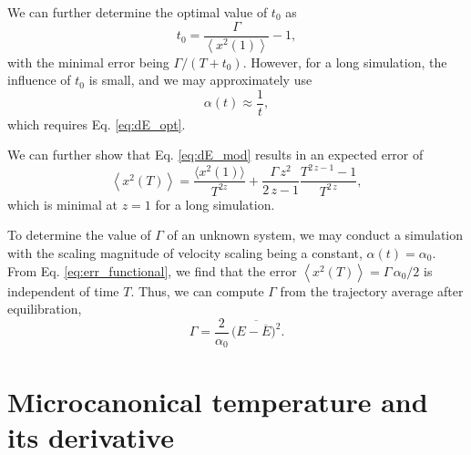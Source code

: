 \documentclass[preprint]{revtex4-1}
\begin{document}
We can further determine the optimal value of $t_0$ as
$$
t_0 = \frac{ \Gamma } { \left\langle x^2(1) \right\rangle } - 1,
$$
%
with the minimal error being $\Gamma / (T + t_0)$.
%
However, for a long simulation, the influence of $t_0$
is small, and we may approximately use
$$
\alpha(t) \approx \frac 1 t,
$$
which requires Eq. \eqref{eq:dE_opt}.

We can further show that Eq. \eqref{eq:dE_mod}
results in an expected error of
\begin{equation}
  \left\langle
  x^2(T)
  \right\rangle
  =
  \frac{ \langle x^2(1) \rangle } { T^{2z} }
  +
  \frac{ \Gamma \, z^2 } { 2 \, z - 1 }
  \frac{
    T^{2 \, z - 1} - 1
  }
  {
    T^{2 \, z}
  }
  ,
  \label{eq:err_zovert}
\end{equation}
which is minimal at $z = 1$ for a long simulation.

To determine the value of $\Gamma$ of an unknown system,
we may conduct a simulation
with the scaling magnitude of velocity scaling
being a constant, $\alpha(t) = \alpha_0$.
%
From Eq. \eqref{eq:err_functional}, we find that
the error
$\left\langle
  x^2(T)
\right\rangle
=
\Gamma \, \alpha_0 / 2$
is independent of time $T$.
Thus, we can compute $\Gamma$ from the trajectory average
after equilibration,
\begin{equation}
\Gamma
=
\frac{ 2 } { \alpha_0 } \,
\overline{
  \bigl(
    E - \overline E
  \bigr)^2
}
.
\label{eq:Gamma_alpha0}
\end{equation}


\section{Microcanonical temperature and its derivative}
\end{document}
